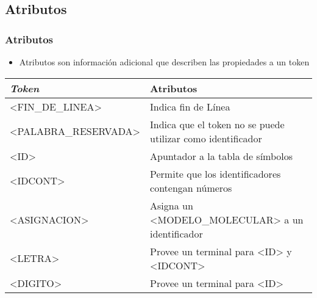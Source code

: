 \documentclass[14pt, aspectratio=169]{beamer}
\begin{document}
\subsection{Atributos}

\begin{frame}
    \frametitle{Atributos}
    \footnotesize
    \begin{itemize}
        \item Atributos son información adicional que describen las propiedades a un token
    \end{itemize}
    \begin{tabularx}{\textwidth}{|X|X|}
        \hline
        \textit{Token}       & Atributos \\\hline
        <FIN\_DE\_LINEA>     & Indica fin de Línea            \\\hline
        <PALABRA\_RESERVADA> & Indica que el token no se puede utilizar como identificador \\\hline
        <ID>                 & Apuntador a la tabla de símbolos    \\\hline
        <IDCONT>             & Permite que los identificadores contengan números    \\\hline
        <ASIGNACION>         & Asigna un <MODELO\_MOLECULAR> a un identificador      \\\hline
        <LETRA>              & Provee un terminal para <ID> y <IDCONT>      \\\hline
        <DIGITO>             & Provee un terminal para <ID>      \\\hline
    \end{tabularx}
\end{frame}
\end{document}
